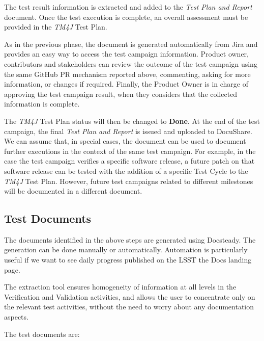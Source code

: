 The test result information is extracted and added to the \textit{Test Plan and Report} document.
Once the test execution is complete, an overall assessment must be provided in the \textit{TM4J} Test Plan.

As in the previous phase, the document is generated automatically from Jira and provides an easy way to access the test campaign information.
Product owner, contributors and stakeholders can review the outcome of the test campaign 
using the same GitHub PR mechanism reported above, commenting, asking for more information, or changes if required.
Finally, the Product Owner is in charge of approving the test campaign result, when they considers that the collected information is complete.

The \textit{TM4J} Test Plan status will then be changed to \textbf{Done}.
At the end of the test campaign, the  final \textit{Test Plan and Report} is issued and uploaded to DocuShare.
We can assume that, in special cases, the document can be used to document further executions in the context of the same test campaign.
For example, in the case the test campaign verifies a specific software release, a future patch on that software release can be tested
with the addition of a specific Test Cycle to the \textit{TM4J} Test Plan.
However, future test campaigns related to different milestones will be documented in a different document.


\subsection{Test Documents}

The documents identified in the above steps are generated using Docsteady.
The generation can be done manually or automatically.
Automation is particularly useful if we want to see daily progress published on the LSST the Docs landing page.

The extraction tool ensures homogeneity of information at all levels in the Verification and Validation activities,
and allows the user to concentrate only on the relevant test activities, without the need to worry about any documentation aspects.

The test documents are:


